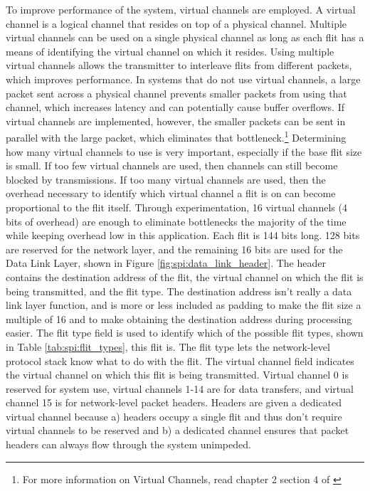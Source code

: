 To improve performance of the system, virtual channels are employed. A virtual channel is a logical channel that resides on top of a physical channel. Multiple virtual channels can be used on a single physical channel as long as each flit has a means of identifying the virtual channel on which it resides. Using multiple virtual channels allows the transmitter to interleave flits from different packets, which improves performance. In systems that do not use virtual channels, a large packet sent across a physical channel prevents smaller packets from using that channel, which increases latency and can potentially cause buffer overflows. If virtual channels are implemented, however, the smaller packets can be sent in parallel with the large packet, which eliminates that bottleneck.\footnote{For more information on Virtual Channels, read chapter 2 section 4 of \cite{ref:1997-duato-interconnection_networks}}
Determining how many virtual channels to use is very important, especially if the base flit size is small. If too few virtual channels are used, then channels can still become blocked by transmissions. If too many virtual channels are used, then the overhead necessary to identify which virtual channel a flit is on can become proportional to the flit itself. Through experimentation, 16 virtual channels (4 bits of overhead) are enough to eliminate bottlenecks the majority of the time while keeping overhead low in this application. 
Each flit is 144 bits long. 128 bits are reserved for the network layer, and the remaining 16 bits are used for the Data Link Layer, shown in Figure \ref{fig:spi:data_link_header}. The header contains the destination address of the flit, the virtual channel on which the flit is being transmitted, and the flit type. The destination address isn't really a data link layer function, and is more or less included as padding to make the flit size a multiple of 16 and to make obtaining the destination address during processing easier. The flit type field is used to identify which of the possible flit types, shown in Table \ref{tab:spi:flit_types}, this flit is. The flit type lets the network-level protocol stack know what to do with the flit. The virtual channel field indicates the virtual channel on which this flit is being transmitted. Virtual channel 0 is reserved for system use, virtual channels 1-14 are for data transfers, and virtual channel 15 is for network-level packet headers. Headers are given a dedicated virtual channel because a) headers occupy a single flit and thus don't require virtual channels to be reserved and b) a dedicated channel ensures that packet headers can always flow through the system unimpeded.

